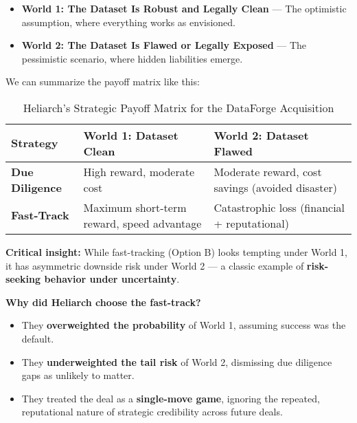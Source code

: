 \begin{itemize}
    \item \textbf{World 1: The Dataset Is Robust and Legally Clean}  
    — The optimistic assumption, where everything works as envisioned.
    
    \item \textbf{World 2: The Dataset Is Flawed or Legally Exposed}  
    — The pessimistic scenario, where hidden liabilities emerge.
\end{itemize}

\medskip

We can summarize the payoff matrix like this:

\begin{table}[H]
    \centering
    \renewcommand{\arraystretch}{1.4} %
    \setlength{\tabcolsep}{8pt} %
    \begin{tabular}{p{4cm} p{4.5cm} p{4.5cm}}
    \toprule
    \textbf{Strategy} & \textbf{World 1: Dataset Clean} & \textbf{World 2: Dataset Flawed} \\
    \midrule
    \textbf{Due Diligence} & High reward, moderate cost & Moderate reward, cost savings (avoided disaster) \\
    \addlinespace
    \textbf{Fast-Track} & Maximum short-term reward, speed advantage & Catastrophic loss (financial + reputational) \\
    \bottomrule
    \end{tabular}
    \caption{Heliarch's Strategic Payoff Matrix for the DataForge Acquisition}
    \end{table}

\medskip

\textbf{Critical insight:}  
While fast-tracking (Option B) looks tempting under World 1, it has asymmetric downside risk under World 2 — a classic example of \textbf{risk-seeking behavior under uncertainty}.

\medskip

\textbf{Why did Heliarch choose the fast-track?}

\begin{itemize}
    \item They \textbf{overweighted the probability} of World 1, assuming success was the default.
    \item They \textbf{underweighted the tail risk} of World 2, dismissing due diligence gaps as unlikely to matter.
    \item They treated the deal as a \textbf{single-move game}, ignoring the repeated, reputational nature of strategic credibility across future deals.
\end{itemize}

